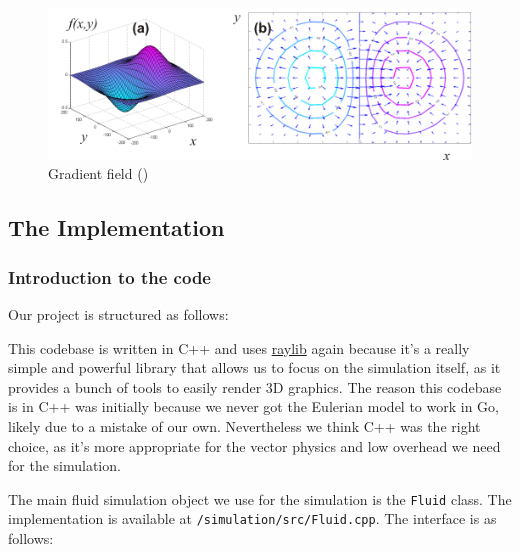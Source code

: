 \documentclass[a4paper,12pt,titlepage]{article}
\begin{document}
\begin{figure}[H]
	\centering
	\includegraphics[width=15cm]{resources/gradient_field.png}
	\caption{Gradient field (\cite{christophefinot})}
	\label{fig:gradient_field}
\end{figure}

\pagebreak
\subsection{The Implementation} \label{implementation}
\subsubsection{Introduction to the code}
Our project is structured as follows:

This codebase is written in C++ and uses \href{https://www.raylib.com/}{raylib} again
because it's a really simple and powerful library that allows us to focus on the
simulation itself, as it provides a bunch of tools to easily render 3D graphics.
The reason this codebase is in C++ was initially because we never got the Eulerian
model to work in Go, likely due to a mistake of our own. Nevertheless we think C++
was the right choice, as it's more appropriate for the vector physics and low overhead
we need for the simulation.

The main fluid simulation object we use for the simulation is the \lstinline{Fluid} class.
The implementation is available at \lstinline{/simulation/src/Fluid.cpp}.
The interface is as follows:
\end{document}
